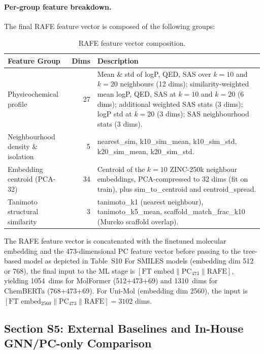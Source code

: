 \documentclass[9pt,a4paper]{article}
\begin{document}
\paragraph{Per-group feature breakdown.}
The final RAFE feature vector is composed of the following groups:

\begin{table}[h]
\centering
\caption{RAFE feature vector composition.}
\label{tab:s4_rafe_features}
\begin{tabular}{lrp{8cm}}
\toprule
Feature Group & Dims & Description \\
\midrule
Physicochemical profile & 27 &
  Mean \& std of logP, QED, SAS over $k{=}10$ and $k{=}20$ neighbours (12 dims);
  similarity-weighted mean logP, QED, SAS at $k{=}10$ and $k{=}20$ (6 dims);
  additional weighted SAS stats (3 dims); logP std at $k{=}20$ (3 dims); SAS
  neighbourhood stats (3 dims). \\
Neighbourhood density \& isolation & 5 &
  nearest\_sim, k10\_sim\_mean, k10\_sim\_std, k20\_sim\_mean, k20\_sim\_std. \\
Embedding centroid (PCA-32) & 34 &
  Centroid of the $k{=}10$ ZINC-250k neighbour embeddings, PCA-compressed to
  32 dims (fit on train), plus sim\_to\_centroid and centroid\_spread. \\
Tanimoto structural similarity & 3 &
  tanimoto\_k1 (nearest neighbour), tanimoto\_k5\_mean,
  scaffold\_match\_frac\_k10 (Murcko scaffold overlap). \\
\bottomrule
\end{tabular}
\end{table}
The RAFE feature vector is concatenated with the finetuned molecular embedding and the 473-dimensional PC feature vector before passing to the tree-based model as depicted in Table~S10
For SMILES models (embedding dim 512 or 768), the final input to the ML stage is
$[\text{FT embed} \| \text{PC}_{473} \| \text{RAFE}]$, yielding 1054~dims for
MolFormer (512+473+69) and 1310~dims for ChemBERTa (768+473+69).
For Uni-Mol (embedding dim 2560), the input is
$[\text{FT embed}_{2560} \| \text{PC}_{473} \| \text{RAFE}] = 3102$ dims.

\subsection*{Section S5: External Baselines and In-House GNN/PC-only Comparison}
\end{document}
